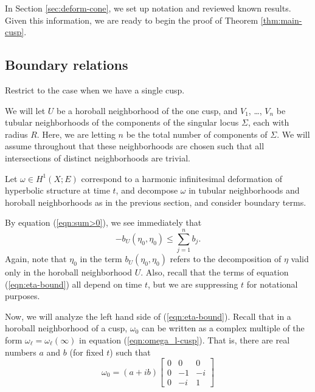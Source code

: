 
In Section \ref{sec:deform-cone}, we set up notation and reviewed
known results.  Given this information, we are ready to begin the
proof of Theorem \ref{thm:main-cusp}.

\subsection{Boundary relations}

Restrict to the case when we have a single cusp.

We will let $U$ be a horoball neighborhood of the one cusp, and $V_1$,
\dots, $V_n$ be tubular neighborhoods of the components of the
singular locus $\Sigma$, each with radius $R$.  Here, we are letting
$n$ be the total number of components of $\Sigma$.  We will assume
throughout that these neighborhoods are chosen such that all
intersections of distinct neighborhoods are trivial.

Let $\omega \in H^1(X;E)$ correspond to a harmonic infinitesimal
deformation of hyperbolic structure at time $t$, and decompose
$\omega$ in tubular neighborhoods and horoball neighborhoods as in the
previous section, and consider boundary terms.

By equation (\ref{eqn:sum>0}), we see immediately that
\begin{equation}
-b_U(\eta_0, \eta_0) \leq \sum_{j=1}^n b_j.
\label{eqn:eta-bound}
\end{equation}
Again, note that $\eta_0$ in the term $b_U(\eta_0,\eta_0)$ refers to
the decomposition of $\eta$ valid only in the horoball neighborhood
$U$.
Also, recall that the terms of equation (\ref{eqn:eta-bound}) all
depend on time $t$, but we are suppressing $t$ for notational
purposes.


Now, we will analyze the left hand side of (\ref{eqn:eta-bound}).
Recall that in a horoball neighborhood of a cusp, $\omega_0$ can be
written as a complex multiple of the form $\omega_\ell =
\omega_\ell(\infty)$ in equation (\ref{eqn:omega_l-cusp}).  That is,
there are real numbers $a$ and $b$
(for fixed $t$)
such that
\begin{equation}
\omega_0 = (a+ib)\left[
  \begin{array}{ccc}
    0&0&0\\
    0&-1&-i\\
    0&-i&1
  \end{array}\right]
\label{eqn:eta_0-matrix}
\end{equation}

